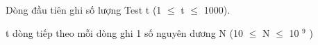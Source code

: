 Dòng đầu tiên ghi số lượng Test t (1  $\le$  t  $\le$  1000).  

   t dòng tiếp theo mỗi dòng ghi 1 số nguyên dương N (10  $\le$  N  $\le$  10   $^    9   $   )